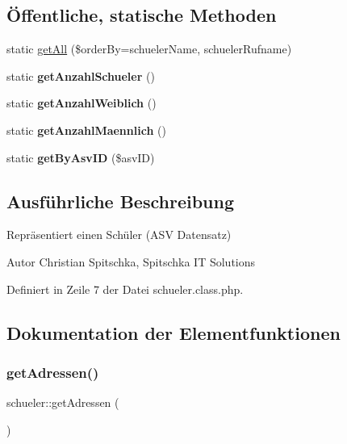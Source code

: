 \subsection*{Öffentliche, statische Methoden}
\begin{DoxyCompactItemize}
\item 
static \mbox{\hyperlink{classschueler_a950f5d55b69ceb06cf4c73a00b986a6d}{get\+All}} (\$order\+By=\textquotesingle{}schueler\+Name, schueler\+Rufname\textquotesingle{})
\item 
\mbox{\label{classschueler_aa8ab8bc1781a9bc27d085b297d75a129}} 
static {\bfseries get\+Anzahl\+Schueler} ()
\item 
\mbox{\label{classschueler_a2f9cdb4e53da0227a4528a97091bacfa}} 
static {\bfseries get\+Anzahl\+Weiblich} ()
\item 
\mbox{\label{classschueler_ae0c6c039e9bc079efb5d12c156fbcb84}} 
static {\bfseries get\+Anzahl\+Maennlich} ()
\item 
\mbox{\label{classschueler_a8bd53959a50b97012a4e42d7cb7925d5}} 
static {\bfseries get\+By\+Asv\+ID} (\$asv\+ID)
\end{DoxyCompactItemize}


\subsection{Ausführliche Beschreibung}
Repräsentiert einen Schüler (A\+SV Datensatz) \begin{DoxyAuthor}{Autor}
Christian Spitschka, Spitschka IT Solutions 
\end{DoxyAuthor}


Definiert in Zeile 7 der Datei schueler.\+class.\+php.



\subsection{Dokumentation der Elementfunktionen}
\mbox{\label{classschueler_a27dbf35c3d9e8176c93ce2c3128cd161}} 
\subsubsection{\texorpdfstring{get\+Adressen()}{getAdressen()}}
{\footnotesize\ttfamily schueler\+::get\+Adressen (\begin{DoxyParamCaption}{ }\end{DoxyParamCaption})}

